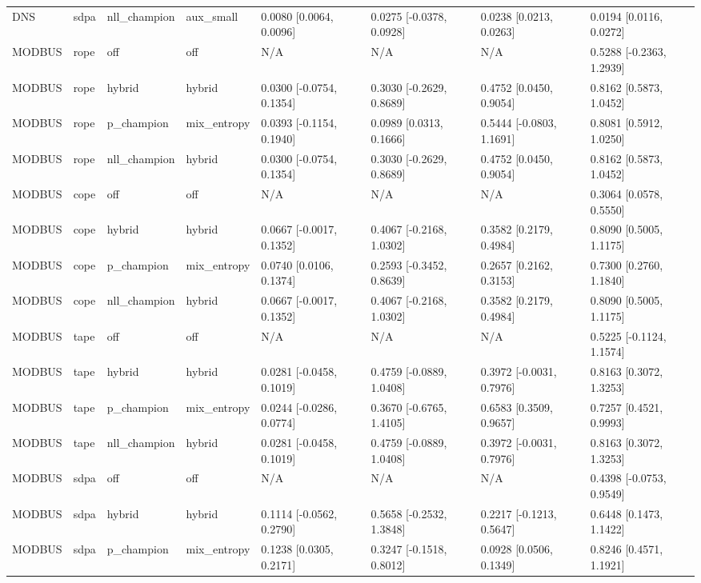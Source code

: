 \begin{tabular}{llllllll}
DNS & sdpa & nll\_champion & aux\_small & 0.0080 [0.0064, 0.0096] & 0.0275 [-0.0378, 0.0928] & 0.0238 [0.0213, 0.0263] & 0.0194 [0.0116, 0.0272] \\
MODBUS & rope & off & off & N/A & N/A & N/A & 0.5288 [-0.2363, 1.2939] \\
MODBUS & rope & hybrid & hybrid & 0.0300 [-0.0754, 0.1354] & 0.3030 [-0.2629, 0.8689] & 0.4752 [0.0450, 0.9054] & 0.8162 [0.5873, 1.0452] \\
MODBUS & rope & p\_champion & mix\_entropy & 0.0393 [-0.1154, 0.1940] & 0.0989 [0.0313, 0.1666] & 0.5444 [-0.0803, 1.1691] & 0.8081 [0.5912, 1.0250] \\
MODBUS & rope & nll\_champion & hybrid & 0.0300 [-0.0754, 0.1354] & 0.3030 [-0.2629, 0.8689] & 0.4752 [0.0450, 0.9054] & 0.8162 [0.5873, 1.0452] \\
MODBUS & cope & off & off & N/A & N/A & N/A & 0.3064 [0.0578, 0.5550] \\
MODBUS & cope & hybrid & hybrid & 0.0667 [-0.0017, 0.1352] & 0.4067 [-0.2168, 1.0302] & 0.3582 [0.2179, 0.4984] & 0.8090 [0.5005, 1.1175] \\
MODBUS & cope & p\_champion & mix\_entropy & 0.0740 [0.0106, 0.1374] & 0.2593 [-0.3452, 0.8639] & 0.2657 [0.2162, 0.3153] & 0.7300 [0.2760, 1.1840] \\
MODBUS & cope & nll\_champion & hybrid & 0.0667 [-0.0017, 0.1352] & 0.4067 [-0.2168, 1.0302] & 0.3582 [0.2179, 0.4984] & 0.8090 [0.5005, 1.1175] \\
MODBUS & tape & off & off & N/A & N/A & N/A & 0.5225 [-0.1124, 1.1574] \\
MODBUS & tape & hybrid & hybrid & 0.0281 [-0.0458, 0.1019] & 0.4759 [-0.0889, 1.0408] & 0.3972 [-0.0031, 0.7976] & 0.8163 [0.3072, 1.3253] \\
MODBUS & tape & p\_champion & mix\_entropy & 0.0244 [-0.0286, 0.0774] & 0.3670 [-0.6765, 1.4105] & 0.6583 [0.3509, 0.9657] & 0.7257 [0.4521, 0.9993] \\
MODBUS & tape & nll\_champion & hybrid & 0.0281 [-0.0458, 0.1019] & 0.4759 [-0.0889, 1.0408] & 0.3972 [-0.0031, 0.7976] & 0.8163 [0.3072, 1.3253] \\
MODBUS & sdpa & off & off & N/A & N/A & N/A & 0.4398 [-0.0753, 0.9549] \\
MODBUS & sdpa & hybrid & hybrid & 0.1114 [-0.0562, 0.2790] & 0.5658 [-0.2532, 1.3848] & 0.2217 [-0.1213, 0.5647] & 0.6448 [0.1473, 1.1422] \\
MODBUS & sdpa & p\_champion & mix\_entropy & 0.1238 [0.0305, 0.2171] & 0.3247 [-0.1518, 0.8012] & 0.0928 [0.0506, 0.1349] & 0.8246 [0.4571, 1.1921] \\

\end{tabular}
